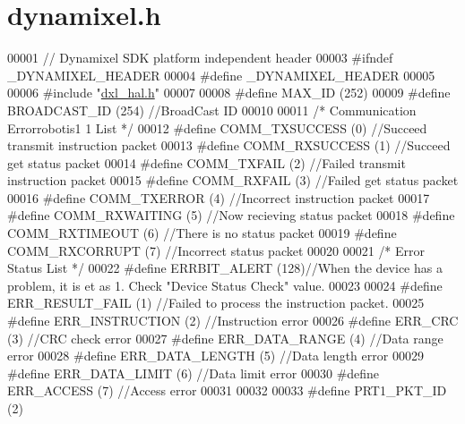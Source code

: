 \hypertarget{dynamixel_8h_source}{}\section{dynamixel.\+h}
\label{dynamixel_8h_source}

\begin{DoxyCode}
00001 \textcolor{comment}{// Dynamixel SDK platform independent header}
00003 \textcolor{preprocessor}{#ifndef \_DYNAMIXEL\_HEADER}
00004 \textcolor{preprocessor}{#define \_DYNAMIXEL\_HEADER}
00005 
00006 \textcolor{preprocessor}{#include "\hyperlink{dxl__hal_8h}{dxl\_hal.h}"}
00007 
00008 \textcolor{preprocessor}{#define MAX\_ID              (252)}
00009 \textcolor{preprocessor}{#define BROADCAST\_ID        (254)  //BroadCast ID}
00010 
00011 \textcolor{comment}{/* Communication Errorrobotis1  1 List */}
00012 \textcolor{preprocessor}{#define COMM\_TXSUCCESS      (0)  //Succeed transmit instruction packet}
00013 \textcolor{preprocessor}{#define COMM\_RXSUCCESS      (1)  //Succeed get status packet}
00014 \textcolor{preprocessor}{#define COMM\_TXFAIL         (2)  //Failed transmit instruction packet}
00015 \textcolor{preprocessor}{#define COMM\_RXFAIL         (3)  //Failed get status packet}
00016 \textcolor{preprocessor}{#define COMM\_TXERROR        (4)  //Incorrect instruction packet}
00017 \textcolor{preprocessor}{#define COMM\_RXWAITING      (5)  //Now recieving status packet}
00018 \textcolor{preprocessor}{#define COMM\_RXTIMEOUT      (6)  //There is no status packet}
00019 \textcolor{preprocessor}{#define COMM\_RXCORRUPT      (7)  //Incorrect status packet}
00020 
00021 \textcolor{comment}{/* Error Status List */}
00022 \textcolor{preprocessor}{#define ERRBIT\_ALERT        (128)//When the device has a problem, it is et as 1. Check "Device Status
       Check" value.}
00023 
00024 \textcolor{preprocessor}{#define ERR\_RESULT\_FAIL     (1)  //Failed to process the instruction packet.}
00025 \textcolor{preprocessor}{#define ERR\_INSTRUCTION     (2)  //Instruction error}
00026 \textcolor{preprocessor}{#define ERR\_CRC             (3)  //CRC check error}
00027 \textcolor{preprocessor}{#define ERR\_DATA\_RANGE      (4)  //Data range error}
00028 \textcolor{preprocessor}{#define ERR\_DATA\_LENGTH     (5)  //Data length error}
00029 \textcolor{preprocessor}{#define ERR\_DATA\_LIMIT      (6)  //Data limit error}
00030 \textcolor{preprocessor}{#define ERR\_ACCESS          (7)  //Access error}
00031 
00032 
00033 \textcolor{preprocessor}{#define PRT1\_PKT\_ID                 (2)}

\end{DoxyCode}
